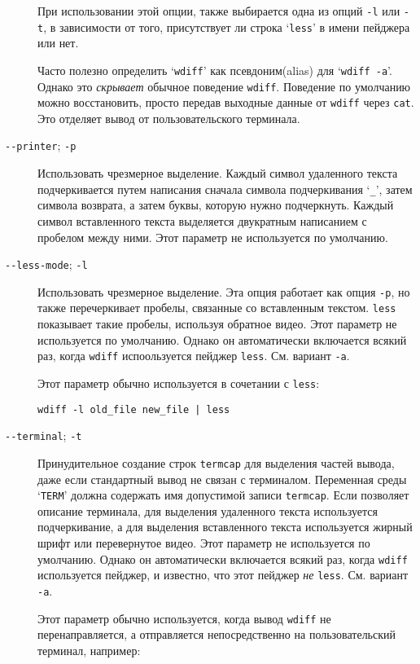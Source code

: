 \begin{description}
При использовании этой опции, также выбирается одна из опций \texttt{-l}
или \texttt{-t}, в зависимости от того, присутствует ли строка
`\texttt{less}' в имени пейджера или нет.

Часто полезно определить `\texttt{wdiff}' как псевдоним(alias) для
`\texttt{wdiff
-a}'. Однако это \emph{скрывает} обычное поведение \texttt{wdiff}.
Поведение по умолчанию можно восстановить, просто передав выходные
данные от \texttt{wdiff} через \texttt{cat}. Это отделяет вывод от
пользовательского терминала.
\item[\texttt{-\/-printer}; \texttt{-p}]
Использовать чрезмерное выделение. Каждый символ удаленного текста
подчеркивается путем написания сначала символа подчеркивания
`\texttt{\_}', затем символа возврата, а затем буквы, которую нужно
подчеркнуть. Каждый символ вставленного текста выделяется двукратным
написанием с пробелом между ними. Этот параметр не используется по
умолчанию.
\item[\texttt{-\/-less-mode}; \texttt{-l}]
Использовать чрезмерное выделение. Эта опция работает как опция
\texttt{-p}, но также перечеркивает пробелы, связанные со вставленным
текстом. \texttt{less} показывает такие пробелы, используя обратное
видео. Этот параметр не используется по умолчанию. Однако он
автоматически включается всякий раз, когда \texttt{wdiff} испоользуется
пейджер \texttt{less}. См. вариант \texttt{-a}.

Этот параметр обычно используется в сочетании с \texttt{less}:

\begin{verbatim}
wdiff -l old_file new_file | less
\end{verbatim}
\item[\texttt{-\/-terminal}; \texttt{-t}]
Принудительное создание строк \texttt{termcap} для выделения частей
вывода, даже если стандартный вывод не связан с терминалом. Переменная
среды `\texttt{TERM}' должна содержать имя допустимой записи
\texttt{termcap}. Если позволяет описание терминала, для выделения
удаленного текста используется подчеркивание, а для выделения
вставленного текста используется жирный шрифт или перевернутое видео.
Этот параметр не используется по умолчанию. Однако он автоматически
включается всякий раз, когда \texttt{wdiff} используется пейджер, и
известно, что этот пейджер \emph{не} \texttt{less}. См. вариант
\texttt{-a}.

Этот параметр обычно используется, когда вывод \texttt{wdiff} не
перенаправляется, а отправляется непосредственно на пользовательский
терминал, например:


\end{description}
